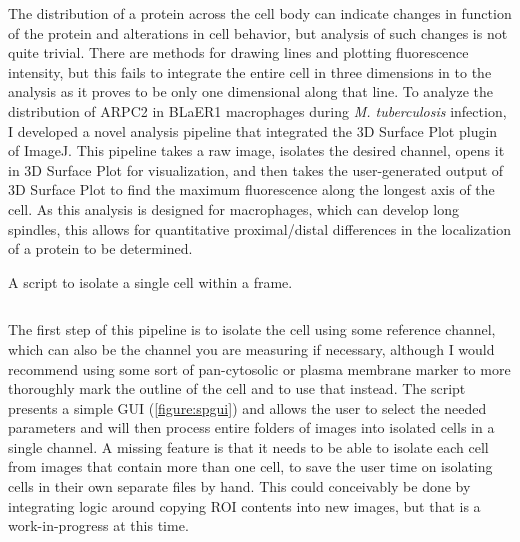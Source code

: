 The distribution of a protein across the cell body can indicate changes in function of the protein and alterations in cell behavior, but analysis of such changes is not quite trivial. There are methods for drawing lines and plotting fluorescence intensity, but this fails to integrate the entire cell in three dimensions in to the analysis as it proves to be only one dimensional along that line. To analyze the distribution of ARPC2 in BLaER1 macrophages during \textit{M. tuberculosis} infection, I developed a novel analysis pipeline that integrated the 3D Surface Plot plugin of ImageJ. This pipeline takes a raw image, isolates the desired channel, opens it in 3D Surface Plot for visualization, and then takes the user\hyp{}generated output of 3D Surface Plot to find the maximum fluorescence along the longest axis of the cell. As this analysis is designed for macrophages, which can develop long spindles, this allows for quantitative proximal/distal differences in the localization of a protein to be determined.

\begin{code}
\caption{A script to isolate a single cell within a frame.}
\label{isolator}

\inputminted[breaklines,frame=single,fontsize=\small]{python}{source/autoIsolator.py}

\end{code}

The first step of this pipeline is to isolate the cell using some reference channel, which can also be the channel you are measuring if necessary, although I would recommend using some sort of pan\hyp{}cytosolic or plasma membrane marker to more thoroughly mark the outline of the cell and to use that instead. The script presents a simple GUI (\autoref{figure:spgui}) and allows the user to select the needed parameters and will then process entire folders of images into isolated cells in a single channel. A missing feature is that it needs to be able to isolate each cell from images that contain more than one cell, to save the user time on isolating cells in their own separate files by hand. This could conceivably be done by integrating logic around copying ROI contents into new images, but that is a work\hyp{}in\hyp{}progress at this time.

